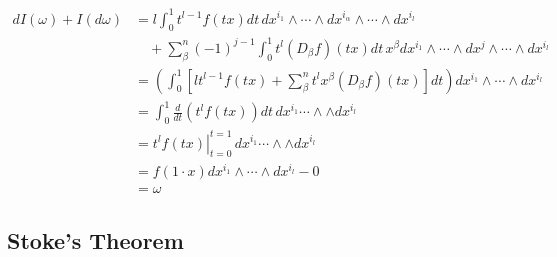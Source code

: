 \documentclass[11pt]{article}
\begin{document}
\begin{align*}
dI(\omega) + I(d\omega) &= l \int_0^1 t^{l-1}f(tx) dt\, dx^{i_1} \wedge \cdots \wedge dx^{i_\alpha} \wedge \cdots \wedge dx^{i_l}\\
&\quad + \sum\limits_{\beta}^{n} (-1)^{j-1} \int_0^1 t^{l} (D_\beta f)(tx) dt \,  x^{\beta} dx^{i_1} \wedge \cdots \wedge dx^{j}  \wedge \cdots \wedge dx^{i_l}\\
 &=\left(\int_0^1 \left[ l t^{l-1}f(tx) + \sum\limits_{\beta}^{n}  t^{l}x^{\beta} (D_\beta f)(tx)\right] dt \right) dx^{i_1}  \wedge\cdots \wedge dx^{i_l}\\
 &=\int_0^1\frac{d}{dt} \left( t^l f(tx) \right)dt \, dx^{i_1} \cdots \wedge \wedge dx^{i_l}\\
 &= \left. t^l f(tx) \right|_{t=0}^{t=1} \, dx^{i_1} \cdots \wedge \wedge dx^{i_l}\\
&=  f(1\cdot x)dx^{i_1}  \wedge \cdots \wedge dx^{i_l} -0 \\
&= \omega
\end{align*}

\subsection{Stoke's Theorem}
\end{document}
